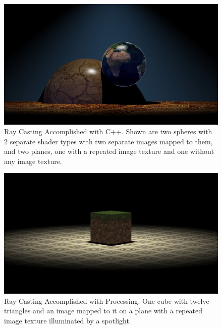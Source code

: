 \begin{figure}[ht]
\centering
\includegraphics[width=\textwidth]{figures/texturingC++.jpg}
\caption{Ray Casting Accomplished with C++.  Shown are two spheres with 2 separate shader types with two separate images mapped to them, and two planes, one with a repeated image texture and one without any image texture. }
\label{fig:cplusraycasting}
\end{figure}

\begin{figure}[ht]
\centering
\includegraphics[width=\textwidth]{figures/processingTriangles.png}
\caption{Ray Casting Accomplished with Processing. One cube with twelve triangles and an image mapped to it on a plane with a repeated image texture illuminated by a spotlight.}
\label{fig:processingtriangles}
\end{figure}

